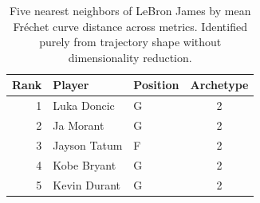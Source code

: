 \begin{table}[htbp]
  \centering\small
  \begin{tabular}{rllc}
    \toprule
    Rank & Player & Position & Archetype \\
    \midrule
    1 & Luka Doncic & G & 2 \\
    2 & Ja Morant & G & 2 \\
    3 & Jayson Tatum & F & 2 \\
    4 & Kobe Bryant & G & 2 \\
    5 & Kevin Durant & G & 2 \\
    \bottomrule
  \end{tabular}
  \caption{Five nearest neighbors of LeBron James by mean Fr\'{e}chet curve distance across metrics. Identified purely from trajectory shape without dimensionality reduction.}
  \label{tab:LeBron_James_frechet_curve_neighbors}
\end{table}

